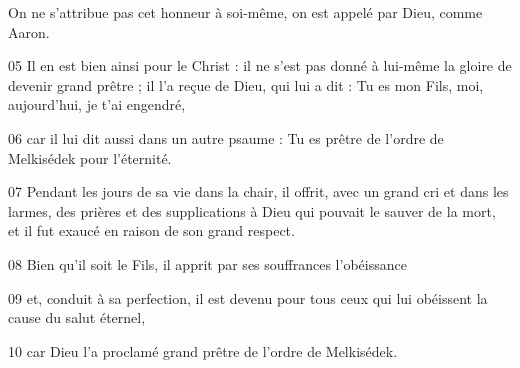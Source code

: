 On ne s’attribue pas cet honneur à soi-même, on est appelé par Dieu, comme Aaron.

05 Il en est bien ainsi pour le Christ : il ne s’est pas donné à lui-même la gloire de devenir grand prêtre ; il l’a reçue de Dieu, qui lui a dit : Tu es mon Fils, moi, aujourd’hui, je t’ai engendré,

06 car il lui dit aussi dans un autre psaume : Tu es prêtre de l’ordre de Melkisédek pour l’éternité.

07 Pendant les jours de sa vie dans la chair, il offrit, avec un grand cri et dans les larmes, des prières et des supplications à Dieu qui pouvait le sauver de la mort, et il fut exaucé en raison de son grand respect.

08 Bien qu’il soit le Fils, il apprit par ses souffrances l’obéissance

09 et, conduit à sa perfection, il est devenu pour tous ceux qui lui obéissent la cause du salut éternel,

10 car Dieu l’a proclamé grand prêtre de l’ordre de Melkisédek.